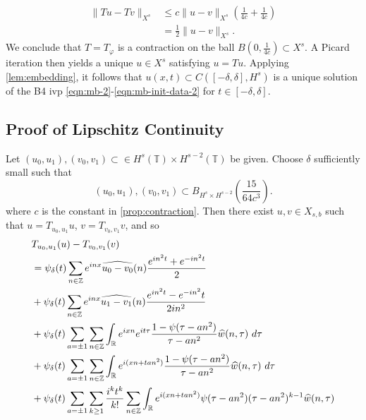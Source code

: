 \documentclass[12pt,reqno]{amsart}
\numberwithin{equation}{section}  %
\newcommand{\rr}{\mathbb{R}}
\newcommand{\zz}{\mathbb{Z}}
\newcommand{\ci}{\mathbb{T}}
\newcommand{\wh}{\widehat}
\newcommand{\vp}{\varphi}
\begin{document}
%
\begin{equation}
	\label{21a}
	\begin{split}
		\|Tu - Tv \|_{X^{s}}
		& \le c \|u -v \|_{X^{s}} \left( \frac{1}{4c} + 
		\frac{1}{4c} \right)
		\\
		& = \frac{1}{2} \|u -v \|_{X^{s}}. 
	\end{split}
\end{equation}
%
We conclude that $T = T_{\vp}$ is a contraction on the ball $B(0, 
\frac{1}{4c}) \subset X^{s}$. A Picard iteration then yields a unique 
$u \in X^{s}$ satisfying $u = Tu$. Applying
\cref{lem:embedding}, it follows that $u(x,t) \subset C( [-\delta, \delta], H^s)$ is a unique
solution of the B4 ivp \eqref{eqn:mb-2}-\eqref{eqn:mb-init-data-2} for $t
\in [-\delta, \delta]$.
%
%
\subsection{Proof of Lipschitz Continuity} 
\label{sec:lip-continuity}
%
%
%
%
Let $(u_0, u_1), (v_0, v_1) \subset \in H^{s}(\ci) \times H^{s-2}(\ci)  $
be given. Choose $\delta$ sufficiently small
such that $$(u_0, u_1), (v_0, v_1)  \subset
B_{H^{s} \times H^{s-2}} \left (\frac{15}{64c^{3}} \right ).$$ where $c$ is
the constant in \cref{prop:contraction}. Then there exist $u, v \in
X_{s,b}$ such that $u =
T_{u_0, u_1}u$, $v = T_{v_0, v_1} v$, and so
%
%
\begin{align}
  \notag
    & T_{u_0, u_1}(u) - T_{v_0, v_1}(v)
		\\
    & = \psi_{\delta}(t) \sum_{n \in \zz} e^{inx} \wh{u_{0} - v_{0} }(n) \frac{e^{in^{2}t} + e^{-in^{2}t}}{2} 
\label{main-rel-term-1g}
  \\
  & + \psi_{\delta}(t) \sum_{n \in \zz} e^{inx}
  \wh{u_{1} - v_{1} }(n)\frac{e^{in^{2}t} - e^{-in^{2}}t}{2 i n^{2}} 
\label{main-rel-term-2g}
  \\
  & + \psi_{\delta}(t) \sum_{a = \pm 1} \sum_{n\in \zz} \int_\rr e^{ixn}  
  e^{it \tau} \frac{ 1 - \psi(\tau -  an^{2}) 
  }{\tau -  an^{2}} \wh{w}(n, \tau) \ d \tau
\label{main-rel-term-3g}
  \\
  & + \psi_{\delta}(t) \sum_{a = \pm 1} \sum_{n\in \zz} \int_\rr e^{i(xn + 
  t an^{2})}
  \frac{1- \psi(\tau -  an^{2})}{\tau -  an^{2}} \wh{w}(n, \tau) \ d \tau
\label{main-rel-term-4g}
  \\
  & + \psi_{\delta}(t) \sum_{a = \pm 1}  \sum_{k \ge 1} \frac{i^k t^k}{k!}
  \sum_{n \in \zz} \int_\rr e^{i(xn + t an^{2} )}
  \psi(\tau -  an^{2}) (\tau -  an^{2})^{k-1} \wh{w}(n, \tau)
  \label{main-rel-term-5g}
\end{align}
\end{document}
